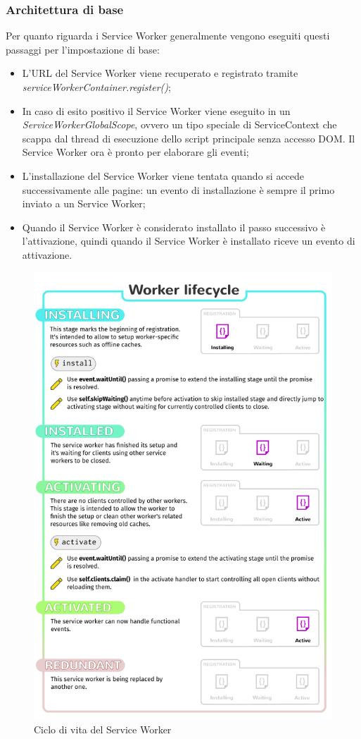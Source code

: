 \documentclass[11pt ,a4paper , twoside , openright ]{article}
\begin{document}
\subsubsection{Architettura di base}
Per quanto riguarda i Service Worker generalmente vengono eseguiti questi passaggi per l'impostazione di base:
\begin{itemize}
	\item L'URL del Service Worker viene recuperato e registrato tramite \textit{serviceWorkerContainer.register()};
	\item In caso di esito positivo il Service Worker viene eseguito in un \textit{ServiceWorkerGlobalScope}, ovvero un tipo speciale di ServiceContext che scappa dal thread di esecuzione dello script principale senza accesso DOM. Il Service Worker ora è pronto per elaborare gli eventi;
	\item L'installazione del Service Worker viene tentata quando si accede successivamente alle pagine: un evento di installazione è sempre il primo inviato a un Service Worker;
	\item Quando il Service Worker è considerato installato il passo successivo è l'attivazione, quindi quando il Service Worker è installato riceve un evento di attivazione.
\end{itemize}
\begin{figure}[h]
	\centering
	\includegraphics[width=0.6\linewidth]{SwLifecycle}
	\caption{Ciclo di vita del Service Worker}
	\label{fig:Ciclo di vita del Service Worker}
\end{figure}
\end{document}

